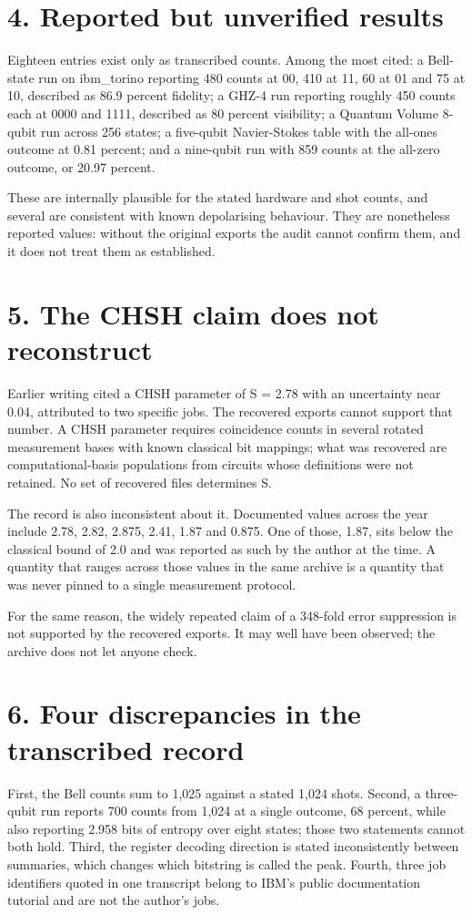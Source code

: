 \documentclass[11pt]{article}
\begin{document}
\section*{4. Reported but unverified results}
Eighteen entries exist only as transcribed counts. Among the most cited: a Bell-state run on ibm\_torino reporting 480 counts at 00, 410 at 11, 60 at 01 and 75 at 10, described as 86.9 percent fidelity; a GHZ-4 run reporting roughly 450 counts each at 0000 and 1111, described as 80 percent visibility; a Quantum Volume 8-qubit run across 256 states; a five-qubit Navier-Stokes table with the all-ones outcome at 0.81 percent; and a nine-qubit run with 859 counts at the all-zero outcome, or 20.97 percent.

These are internally plausible for the stated hardware and shot counts, and several are consistent with known depolarising behaviour. They are nonetheless reported values: without the original exports the audit cannot confirm them, and it does not treat them as established.

\section*{5. The CHSH claim does not reconstruct}
Earlier writing cited a CHSH parameter of S = 2.78 with an uncertainty near 0.04, attributed to two specific jobs. The recovered exports cannot support that number. A CHSH parameter requires coincidence counts in several rotated measurement bases with known classical bit mappings; what was recovered are computational-basis populations from circuits whose definitions were not retained. No set of recovered files determines S.

The record is also inconsistent about it. Documented values across the year include 2.78, 2.82, 2.875, 2.41, 1.87 and 0.875. One of those, 1.87, sits below the classical bound of 2.0 and was reported as such by the author at the time. A quantity that ranges across those values in the same archive is a quantity that was never pinned to a single measurement protocol.

For the same reason, the widely repeated claim of a 348-fold error suppression is not supported by the recovered exports. It may well have been observed; the archive does not let anyone check.

\section*{6. Four discrepancies in the transcribed record}
First, the Bell counts sum to 1,025 against a stated 1,024 shots. Second, a three-qubit run reports 700 counts from 1,024 at a single outcome, 68 percent, while also reporting 2.958 bits of entropy over eight states; those two statements cannot both hold. Third, the register decoding direction is stated inconsistently between summaries, which changes which bitstring is called the peak. Fourth, three job identifiers quoted in one transcript belong to IBM's public documentation tutorial and are not the author's jobs.
\end{document}
